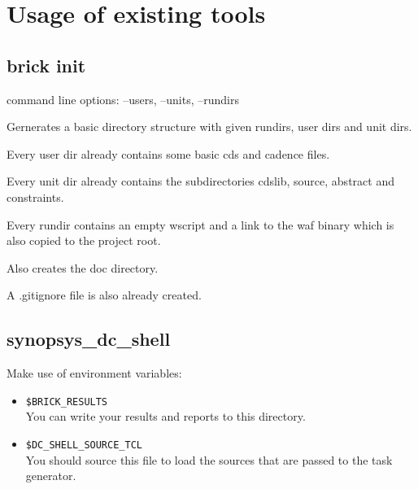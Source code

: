 \chapter{Usage of existing  tools}
\label{chap:bricktools}
\section{brick init}

command line options: --users, --units, --rundirs

Gernerates a basic directory structure with given rundirs, user dirs and unit dirs.

Every user dir already contains some basic cds and cadence files.

Every unit dir already contains the subdirectories cdslib, source, abstract and constraints.

Every rundir contains an empty wscript and a link to the waf binary which is also copied to the project root.

Also creates the doc directory.

A .gitignore file is also already created.

\section{synopsys\_dc\_shell}

Make use of environment variables:
\begin{itemize}
	\item \lstinline[style=BashInputStyle]'$BRICK_RESULTS'\\
		You can write your results and reports to this directory.
	\item \lstinline[style=BashInputStyle]'$DC_SHELL_SOURCE_TCL'\\
		You should source this file to load the sources that are passed to the task generator.
\end{itemize}

